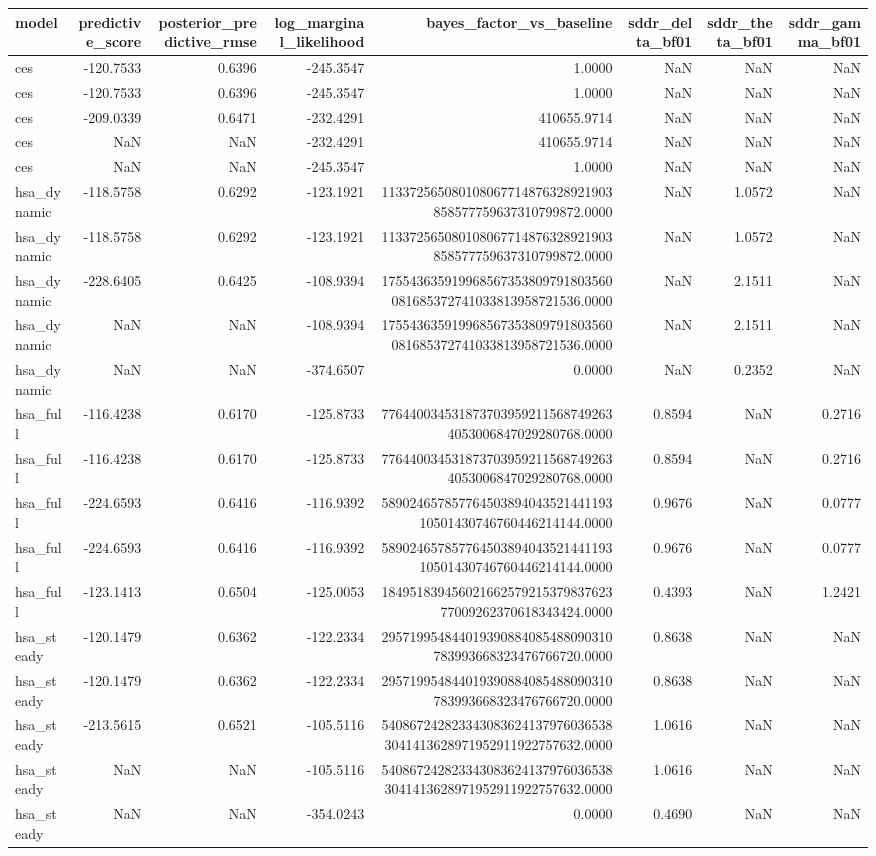 \begin{tabular}{lrrrrrrr}
\toprule
model & predictive\_score & posterior\_predictive\_rmse & log\_marginal\_likelihood & bayes\_factor\_vs\_baseline & sddr\_delta\_bf01 & sddr\_theta\_bf01 & sddr\_gamma\_bf01 \\
\midrule
ces & -120.7533 & 0.6396 & -245.3547 & 1.0000 & NaN & NaN & NaN \\
ces & -120.7533 & 0.6396 & -245.3547 & 1.0000 & NaN & NaN & NaN \\
ces & -209.0339 & 0.6471 & -232.4291 & 410655.9714 & NaN & NaN & NaN \\
ces & NaN & NaN & -232.4291 & 410655.9714 & NaN & NaN & NaN \\
ces & NaN & NaN & -245.3547 & 1.0000 & NaN & NaN & NaN \\
hsa\_dynamic & -118.5758 & 0.6292 & -123.1921 & 113372565080108067714876328921903858577759637310799872.0000 & NaN & 1.0572 & NaN \\
hsa\_dynamic & -118.5758 & 0.6292 & -123.1921 & 113372565080108067714876328921903858577759637310799872.0000 & NaN & 1.0572 & NaN \\
hsa\_dynamic & -228.6405 & 0.6425 & -108.9394 & 175543635919968567353809791803560081685372741033813958721536.0000 & NaN & 2.1511 & NaN \\
hsa\_dynamic & NaN & NaN & -108.9394 & 175543635919968567353809791803560081685372741033813958721536.0000 & NaN & 2.1511 & NaN \\
hsa\_dynamic & NaN & NaN & -374.6507 & 0.0000 & NaN & 0.2352 & NaN \\
hsa\_full & -116.4238 & 0.6170 & -125.8733 & 7764400345318737039592115687492634053006847029280768.0000 & 0.8594 & NaN & 0.2716 \\
hsa\_full & -116.4238 & 0.6170 & -125.8733 & 7764400345318737039592115687492634053006847029280768.0000 & 0.8594 & NaN & 0.2716 \\
hsa\_full & -224.6593 & 0.6416 & -116.9392 & 58902465785776450389404352144119310501430746760446214144.0000 & 0.9676 & NaN & 0.0777 \\
hsa\_full & -224.6593 & 0.6416 & -116.9392 & 58902465785776450389404352144119310501430746760446214144.0000 & 0.9676 & NaN & 0.0777 \\
hsa\_full & -123.1413 & 0.6504 & -125.0053 & 18495183945602166257921537983762377009262370618343424.0000 & 0.4393 & NaN & 1.2421 \\
hsa\_steady & -120.1479 & 0.6362 & -122.2334 & 295719954844019390884085488090310783993668323476766720.0000 & 0.8638 & NaN & NaN \\
hsa\_steady & -120.1479 & 0.6362 & -122.2334 & 295719954844019390884085488090310783993668323476766720.0000 & 0.8638 & NaN & NaN \\
hsa\_steady & -213.5615 & 0.6521 & -105.5116 & 5408672428233430836241379760365383041413628971952911922757632.0000 & 1.0616 & NaN & NaN \\
hsa\_steady & NaN & NaN & -105.5116 & 5408672428233430836241379760365383041413628971952911922757632.0000 & 1.0616 & NaN & NaN \\
hsa\_steady & NaN & NaN & -354.0243 & 0.0000 & 0.4690 & NaN & NaN \\
\bottomrule
\end{tabular}
